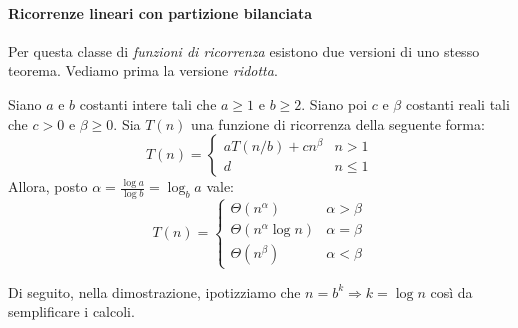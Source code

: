 \paragraph{Ricorrenze lineari con partizione bilanciata}
Per questa classe di \emph{funzioni di ricorrenza} esistono due versioni di uno
stesso teorema. Vediamo prima la versione \emph{ridotta}.
\begin{definition}
    Siano $a$ e $b$ costanti intere tali che $a\geq1$ e $b\geq2$. Siano poi $c$
    e $\beta$ costanti reali tali che $c>0$ e $\beta\geq0$. Sia $T(n)$ una
    funzione di ricorrenza della seguente forma:
    \[T(n)=\begin{cases}
        aT(n/b)+c n^\beta & n>1\\
        d & n\leq1
    \end{cases}\]
    Allora, posto $\alpha=\frac{\log a}{\log b}=\log_b a$ vale:
    \[T(n)=\begin{cases}
        \Theta(n^\alpha) & \alpha>\beta\\
        \Theta(n^\alpha\log n) & \alpha=\beta\\
        \Theta(n^\beta) & \alpha<\beta
    \end{cases}\]
\end{definition}

\begin{note}
    Di seguito, nella dimostrazione, ipotizziamo che $n=b^k\Rightarrow k=\log n$
    così da semplificare i calcoli.
\end{note}

